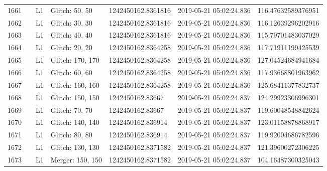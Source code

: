 \begin{longtable}{lllllll}
1661 &                                                    &       L1 &    Glitch: 50, 50 &  1242450162.8361816 &  2019-05-21 05:02:24.836 &  116.47632589376951 \\
1662 &                                                    &       L1 &    Glitch: 30, 30 &  1242450162.8361816 &  2019-05-21 05:02:24.836 &  116.12639296202916 \\
1663 &                                                    &       L1 &    Glitch: 40, 40 &  1242450162.8361816 &  2019-05-21 05:02:24.836 &  115.79701483037029 \\
1664 &                                                    &       L1 &    Glitch: 20, 20 &  1242450162.8364258 &  2019-05-21 05:02:24.836 &  117.71911199425539 \\
1665 &                                                    &       L1 &  Glitch: 170, 170 &  1242450162.8364258 &  2019-05-21 05:02:24.836 &  127.04524684941684 \\
1666 &                                                    &       L1 &    Glitch: 60, 60 &  1242450162.8364258 &  2019-05-21 05:02:24.836 &  117.93668801963962 \\
1667 &                                                    &       L1 &  Glitch: 160, 160 &  1242450162.8364258 &  2019-05-21 05:02:24.836 &  125.68411377832737 \\
1668 &                                                    &       L1 &  Glitch: 150, 150 &    1242450162.83667 &  2019-05-21 05:02:24.837 &  124.29923306996301 \\
1669 &                                                    &       L1 &    Glitch: 70, 70 &    1242450162.83667 &  2019-05-21 05:02:24.837 &  119.60048548842624 \\
1670 &                                                    &       L1 &  Glitch: 140, 140 &   1242450162.836914 &  2019-05-21 05:02:24.837 &  123.01158878868917 \\
1671 &                                                    &       L1 &    Glitch: 80, 80 &   1242450162.836914 &  2019-05-21 05:02:24.837 &  119.92004686782596 \\
1672 &                                                    &       L1 &  Glitch: 130, 130 &  1242450162.8371582 &  2019-05-21 05:02:24.837 &  121.39600272306225 \\
1673 &                                                    &       L1 &  Merger: 150, 150 &  1242450162.8371582 &  2019-05-21 05:02:24.837 &  104.16487300325043 \\

\end{longtable}
